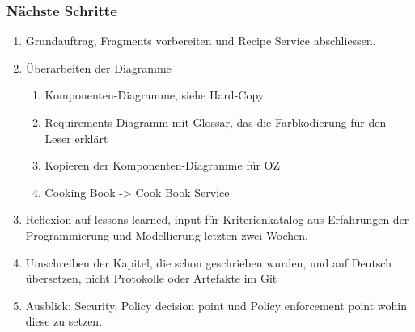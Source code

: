 \documentclass{article}
\begin{document}
\subsubsection{Nächste Schritte}
\begin{enumerate}
    \item Grundauftrag, Fragments vorbereiten und Recipe Service abschliessen.
    \item Überarbeiten der Diagramme
        \begin{enumerate}
            \item Komponenten-Diagramme, siehe Hard-Copy
            \item Requirements-Diagramm mit Glossar, das die Farbkodierung für den Leser erklärt
            \item Kopieren der Komponenten-Diagramme für OZ
            \item Cooking Book -> Cook Book Service
        \end{enumerate}
    \item Reflexion auf lessons learned, input für Kriterienkatalog aus Erfahrungen der Programmierung und Modellierung letzten zwei Wochen.
    \item Umschreiben der Kapitel, die schon geschrieben wurden, und auf Deutsch übersetzen, nicht Protokolle oder Artefakte im Git
    \item Ausblick: Security, Policy decision point und Policy enforcement point wohin diese zu setzen. 
\end{enumerate}
\end{document}

